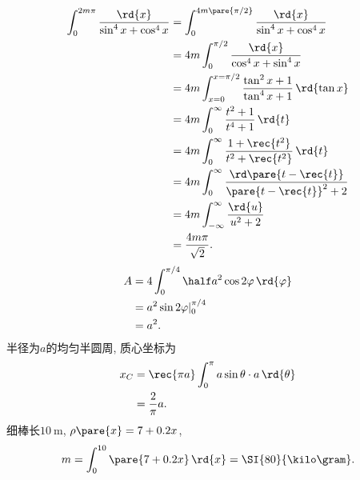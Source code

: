 \documentclass{ctexart}
\begin{document}
\begin{align*}
    \int_0^{2m\pi} \frac{\rd{x}}{\sin^4 x + \cos^4 x} &= \int_0^{4m\pare{\pi/2}} \frac{\rd{x}}{\sin^4 x + \cos^4 x} \\
    &= 4m \int_0^{\pi/2} \frac{\rd{x}}{\cos^4 x + \sin^4 x} \\
    &= 4m \int_{x=0}^{x=\pi/2} \frac{\tan^2 x + 1}{\tan^4 x + 1}\,\rd{\tan x} \\
    &= 4m \int_0^{\infty} \frac{t^2+1}{t^4+1}\,\rd{t} \\
    &= 4m \int_0^{\infty} \frac{1+\rec{t^2}}{t^2 + \rec{t^2}}\,\rd{t} \\
    &= 4m \int_0^\infty \frac{\rd\pare{t - \rec{t}}}{\pare{t-\rec{t}}^2 + 2} \\
    &= 4m \int_{-\infty}^{\infty} \frac{\rd{u}}{u^2 + 2} \\
    &= \frac{4m\pi}{\sqrt{2}}.
\end{align*}
\begin{align*}
    A &= 4\int_0^{\pi/4} \half a^2 \cos 2\varphi\,\rd{\varphi} \\
    &= a^2 \sin 2\varphi \vert_0^{\pi/4} \\
    &= a^2.
\end{align*}
半径为$a$的均匀半圆周, 质心坐标为
\begin{align}
    x_C &= \rec{\pi a} \int_0^\pi a\sin\theta\cdot a\,\rd{\theta} \\
    &= \frac{2}{\pi} a.
\end{align}
细棒长$\SI{10}{\meter}$, $\rho\pare{x} = 7+0.2x$,
\[ m = \int_0^{10} \pare{7+0.2x}\,\rd{x} = \SI{80}{\kilo\gram}. \]
\end{document}
